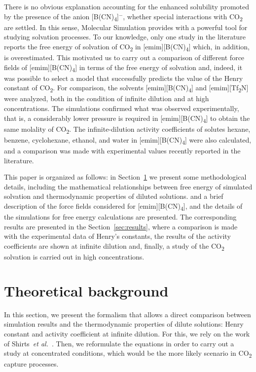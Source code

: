 \documentclass[3p,twocolumn]{elsarticle}
\begin{document}
There is no obvious explanation accounting for the enhanced solubility promoted by the presence of the anion [B(CN)\textsubscript{4}]$^{-}$, whether special interactions with CO\textsubscript{2} are settled. In this sense, Molecular Simulation provides with a powerful tool for studying solvation processes. To our knowledge, only one study in the literature reports the free energy of solvation of CO\textsubscript{2} in [emim][B(CN)\textsubscript{4}] which, in addition, is overestimated. This motivated us to carry out a comparison of different force fields of [emim][B(CN)\textsubscript{4}] in terms of the free energy of solvation and, indeed,  it was possible to select a model that successfully predicts the value of the Henry constant of CO\textsubscript{2}. For comparison, the solvents [emim][B(CN)\textsubscript{4}] and [emim][Tf\textsubscript{2}N] were analyzed, both in the condition of infinite dilution and at high concentrations. The simulations confirmed what was observed experimentally, that is, a considerably lower pressure is required in [emim][B(CN)\textsubscript{4}] to obtain the same molality of CO\textsubscript{2}. The infinite-dilution activity coefficients of solutes hexane, benzene, cyclohexane, ethanol, and water in [emim][B(CN)\textsubscript{4}] were also calculated, and a comparison was made with experimental values recently reported in the literature.

This paper is organized as follows: in Section~\ref{sec:theory} we present some methodological details, including the mathematical relationships between free energy of simulated solvation and thermodynamic properties of diluted solutions. and a brief description of the force fields considered for [emim][B(CN)\textsubscript{4}], and the details of the simulations for free energy calculations are presented. The corresponding results are presented in the Section~\ref{sec:results}, where a comparison is made with the experimental data of Henry's constants, the results of the activity coefficients are shown at infinite dilution and, finally, a study of the CO\textsubscript{2} solvation is carried out in high concentrations.

\section{Theoretical background}
\label{sec:theory}

In this section, we present the formalism that allows a direct comparison between simulation results and the thermodynamic properties of dilute solutions: Henry constant and activity coefficient at infinite dilution. For this, we rely on the work of Shirts~\textit{et al.}~\cite{Shirts_2003}. Then, we reformulate the equations in order to carry out a study at concentrated conditions, which would be the more likely scenario in CO\textsubscript{2} capture processes.
\end{document}
